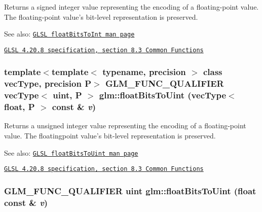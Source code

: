 Returns a signed integer value representing the encoding of a floating-point value. The floating-point value's bit-level representation is preserved.

\begin{Desc}
\item[See also:]\href{http://www.opengl.org/sdk/docs/manglsl/xhtml/floatBitsToInt.xml}{\tt GLSL floatBitsToInt man page} 

\href{http://www.opengl.org/registry/doc/GLSLangSpec.4.20.8.pdf}{\tt GLSL 4.20.8 specification, section 8.3 Common Functions} \end{Desc}
\hypertarget{group__core__func__common_gd25f4b1449b40ee395b05552e98d103b}{
\subsubsection[floatBitsToUint]{\setlength{\rightskip}{0pt plus 5cm}template$<$template$<$ typename, precision $>$ class vecType, precision P$>$ GLM\_\-FUNC\_\-QUALIFIER vecType$<$ uint, P $>$ glm::floatBitsToUint (vecType$<$ float, P $>$ const \& {\em v})}}
\label{group__core__func__common_gd25f4b1449b40ee395b05552e98d103b}


Returns a unsigned integer value representing the encoding of a floating-point value. The floatingpoint value's bit-level representation is preserved.

\begin{Desc}
\item[See also:]\href{http://www.opengl.org/sdk/docs/manglsl/xhtml/floatBitsToUint.xml}{\tt GLSL floatBitsToUint man page} 

\href{http://www.opengl.org/registry/doc/GLSLangSpec.4.20.8.pdf}{\tt GLSL 4.20.8 specification, section 8.3 Common Functions} \end{Desc}
\hypertarget{group__core__func__common_g748b4d2819b48d28ca09dc8733488873}{
\subsubsection[floatBitsToUint]{\setlength{\rightskip}{0pt plus 5cm}GLM\_\-FUNC\_\-QUALIFIER uint glm::floatBitsToUint (float const \& {\em v})}}
\label{group__core__func__common_g748b4d2819b48d28ca09dc8733488873}


